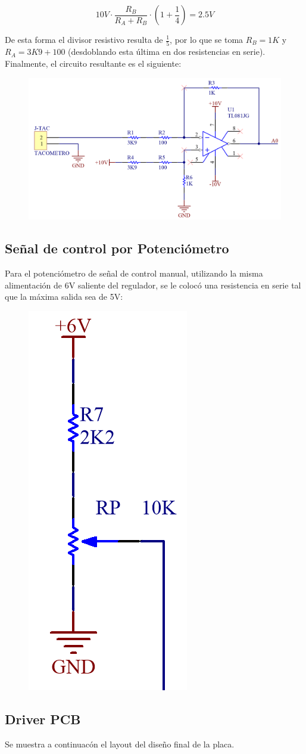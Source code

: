 \documentclass{article}
\begin{document}
\[
10V \cdot \frac{R_B}{R_A + R_B} \cdot \left(1 + \frac{1}{4}\right) = 2.5V
\]

De esta forma el divisor resistivo resulta de $\frac{1}{5}$, por lo que se toma $R_B = 1K$ y $R_A = 3K9 + 100$ (desdoblando esta última en dos resistencias en serie). Finalmente, el circuito resultante es el siguiente:

\begin{figure}[H]
\centering
\includegraphics[width=0.6\linewidth]{../Images/FuncionOpamp.png}
\end{figure}

\subsection{Señal de control por Potenciómetro}

Para el potenciómetro de señal de control manual, utilizando la misma alimentación de 6V saliente del regulador, se le colocó una resistencia en serie tal que la máxima salida sea de 5V:

\begin{figure}[H]
\centering
\includegraphics[width=0.1\linewidth]{../Images/PoteManual.png}
\end{figure}

\subsection{Driver PCB}
Se muestra a continuacón el layout del diseño final de la placa.
\end{document}
